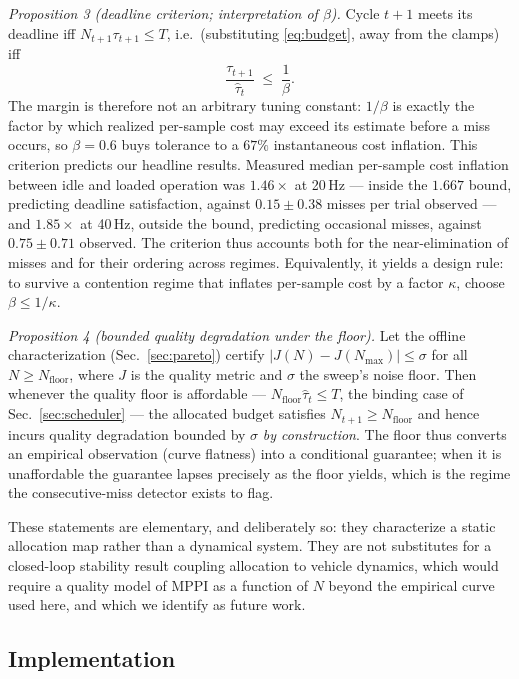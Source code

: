 \documentclass[conference]{IEEEtran}
\begin{document}
\emph{Proposition 3 (deadline criterion; interpretation of $\beta$).}
Cycle $t{+}1$ meets its deadline iff $N_{t+1}\tau_{t+1} \le T$, i.e.\
(substituting \eqref{eq:budget}, away from the clamps) iff
\begin{equation}
\label{eq:criterion}
\frac{\tau_{t+1}}{\hat{\tau}_t} \;\le\; \frac{1}{\beta}.
\end{equation}
The margin is therefore not an arbitrary tuning constant: $1/\beta$ is
exactly the factor by which realized per-sample cost may exceed its
estimate before a miss occurs, so $\beta = 0.6$ buys tolerance to a
$67\%$ instantaneous cost inflation. This criterion predicts our
headline results. Measured median per-sample cost inflation between
idle and loaded operation was $1.46\times$ at 20\,Hz --- inside the
$1.667$ bound, predicting deadline satisfaction, against
$0.15 \pm 0.38$ misses per trial observed --- and $1.85\times$ at
40\,Hz, outside the bound, predicting occasional misses, against
$0.75 \pm 0.71$ observed. The criterion thus accounts both for the
near-elimination of misses and for their ordering across regimes.
Equivalently, it yields a design rule: to survive a contention regime
that inflates per-sample cost by a factor $\kappa$, choose $\beta \le
1/\kappa$.

\emph{Proposition 4 (bounded quality degradation under the floor).}
Let the offline characterization (Sec.~\ref{sec:pareto}) certify
$|J(N) - J(N_{\max})| \le \sigma$ for all $N \ge N_{\mathrm{floor}}$,
where $J$ is the quality metric and $\sigma$ the sweep's noise floor.
Then whenever the quality floor is affordable ---
$N_{\mathrm{floor}}\hat{\tau}_t \le T$, the binding case of
Sec.~\ref{sec:scheduler} --- the allocated budget satisfies $N_{t+1}
\ge N_{\mathrm{floor}}$ and hence incurs quality degradation bounded by
$\sigma$ \emph{by construction}. The floor thus converts an empirical
observation (curve flatness) into a conditional guarantee; when it is
unaffordable the guarantee lapses precisely as the floor yields, which
is the regime the consecutive-miss detector exists to flag.

These statements are elementary, and deliberately so: they characterize
a static allocation map rather than a dynamical system. They are not
substitutes for a closed-loop stability result coupling allocation to
vehicle dynamics, which would require a quality model of MPPI as a
function of $N$ beyond the empirical curve used here, and which we
identify as future work.

\subsection{Implementation}
\end{document}
